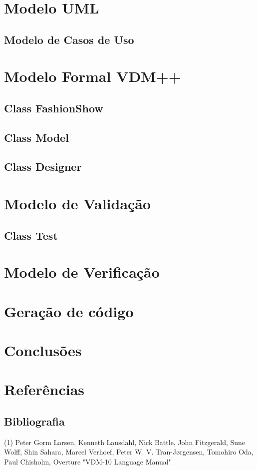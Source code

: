 \documentclass{article}
\begin{document}
\section{Modelo UML}
\subsection{Modelo de Casos de Uso}

\section{Modelo Formal VDM++}
\subsection{Class FashionShow}
\subsection{Class Model}
\subsection{Class Designer}

\section{Modelo de Validação}
\subsection{Class Test}

\section{Modelo de Verificação}

\section{Geração de código}

\section{Conclusões}
\section{Referências}
\subsection{Bibliografia}
\noindent
(1) Peter Gorm Larsen, Kenneth Lausdahl, Nick Battle, John Fitzgerald, Sune Wolff, Shin Sahara, Marcel Verhoef, Peter W. V. Tran-Jørgensen, Tomohiro Oda, Paul Chisholm, Overture "VDM-10 Language Manual"\\
\end{document}
